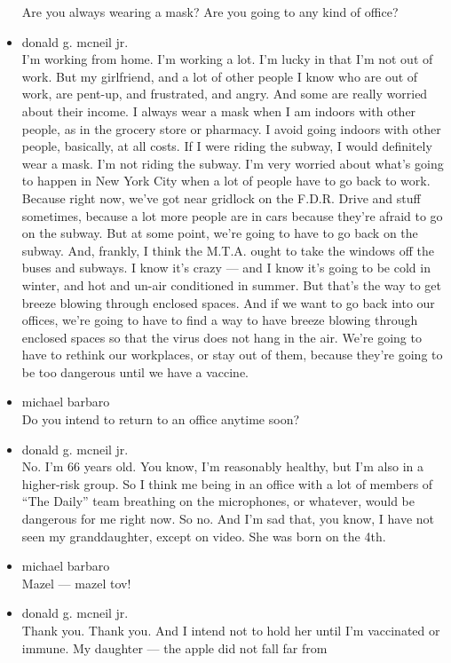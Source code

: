 \begin{itemize}
  Are you always wearing a mask? Are you going to any kind of office?
\item
  donald g. mcneil jr.\\
  I'm working from home. I'm working a lot. I'm lucky in that I'm not
  out of work. But my girlfriend, and a lot of other people I know who
  are out of work, are pent-up, and frustrated, and angry. And some are
  really worried about their income. I always wear a mask when I am
  indoors with other people, as in the grocery store or pharmacy. I
  avoid going indoors with other people, basically, at all costs. If I
  were riding the subway, I would definitely wear a mask. I'm not riding
  the subway. I'm very worried about what's going to happen in New York
  City when a lot of people have to go back to work. Because right now,
  we've got near gridlock on the F.D.R. Drive and stuff sometimes,
  because a lot more people are in cars because they're afraid to go on
  the subway. But at some point, we're going to have to go back on the
  subway. And, frankly, I think the M.T.A. ought to take the windows off
  the buses and subways. I know it's crazy --- and I know it's going to
  be cold in winter, and hot and un-air conditioned in summer. But
  that's the way to get breeze blowing through enclosed spaces. And if
  we want to go back into our offices, we're going to have to find a way
  to have breeze blowing through enclosed spaces so that the virus does
  not hang in the air. We're going to have to rethink our workplaces, or
  stay out of them, because they're going to be too dangerous until we
  have a vaccine.
\item
  michael barbaro\\
  Do you intend to return to an office anytime soon?
\item
  donald g. mcneil jr.\\
  No. I'm 66 years old. You know, I'm reasonably healthy, but I'm also
  in a higher-risk group. So I think me being in an office with a lot of
  members of ``The Daily'' team breathing on the microphones, or
  whatever, would be dangerous for me right now. So no. And I'm sad
  that, you know, I have not seen my granddaughter, except on video. She
  was born on the 4th.
\item
  michael barbaro\\
  Mazel --- mazel tov!
\item
  donald g. mcneil jr.\\
  Thank you. Thank you. And I intend not to hold her until I'm
  vaccinated or immune. My daughter --- the apple did not fall far from

\end{itemize}
